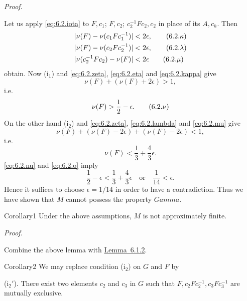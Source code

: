 \documentclass[b5paper,twoside]{article}
\newcommand{\lemref}[2]{\hyperref[#1]{\mbox{Lemma~#2}}}
\theoremstyle{mvnplain}
\renewenvironment{proof}[1][Proof]{%
  \par\addvspace{0.35\baselineskip}%
  \noindent\textit{#1.}\ \normalfont\ignorespaces
}{%
  \par\addvspace{0.35\baselineskip}%
}
\newcommand{\M}{\mathbf M}
\def\M{M}%
\def\Gamma{Gamma}%
\def\mathfrak#1{#1}%
\begin{document}
\begin{proof}
Let us apply \eqref{eq:6.2.iota} to
$\mathfrak F,c_1$; $\mathfrak F,c_2$;
$c_2^{-1}\mathfrak F c_2,c_2$ in place of its $\mathfrak A,c_h$. Then
\begin{align}
 |\nu(\mathfrak F)-\nu(c_1\mathfrak F c_1^{-1})|&<2\epsilon,
  \tag{6.2.\ensuremath{\kappa}}\label{eq:6.2.kappa}\\
 |\nu(\mathfrak F)-\nu(c_2\mathfrak F c_2^{-1})|&<2\epsilon,
  \tag{6.2.\ensuremath{\lambda}}\label{eq:6.2.lambda}\\
 |\nu(c_2^{-1}\mathfrak F c_2)-\nu(\mathfrak F)|&<2\epsilon
  \tag{6.2.\ensuremath{\mu}}\label{eq:6.2.mu}
\end{align}
obtain. Now (i$_1$) and \eqref{eq:6.2.zeta}, \eqref{eq:6.2.eta} and
\eqref{eq:6.2.kappa} give
\[
  \nu(\mathfrak F)+(\nu(\mathfrak F)+2\epsilon)>1,
\]
i.e.
\begin{equation}
  \nu(\mathfrak F)>\frac12-\epsilon.
  \tag{6.2.\ensuremath{\nu}}\label{eq:6.2.nu}
\end{equation}
On the other hand (i$_2$) and \eqref{eq:6.2.zeta},
\eqref{eq:6.2.lambda} and \eqref{eq:6.2.mu} give
\[
  \nu(\mathfrak F)+(\nu(\mathfrak F)-2\epsilon)
  +(\nu(\mathfrak F)-2\epsilon)<1,
\]
i.e.
\begin{equation}
  \nu(\mathfrak F)<\frac13+\frac43\epsilon.
  \tag{6.2.o}\label{eq:6.2.o}
\end{equation}
\eqref{eq:6.2.nu} and \eqref{eq:6.2.o} imply
\[
  \frac12-\epsilon<\frac13+\frac43\epsilon
  \quad\text{or}\quad \frac1{14}<\epsilon.
\]
Hence it suffices to choose $\epsilon=1/14$ in order to have a contradiction.
Thus we have shown that $\M$ cannot possess the property $\Gamma$.
\end{proof}

\begin{namedstatement}{Corollary}{1}\label{cor:6.2.1}
Under the above assumptions, $\M$ is not approximately finite.
\end{namedstatement}
\begin{proof}
Combine the above lemma with \lemref{lem:6.1.2}{6.1.2}.
\end{proof}

\begin{namedstatement}{Corollary}{2}\label{cor:6.2.2}
We may replace condition (i$_2$) on $\mathfrak G$ and $\mathfrak F$ by

\noindent(i$_2'$). There exist two elements $c_2$ and $c_3$ in $\mathfrak G$
such that $\mathfrak F,c_2\mathfrak F c_2^{-1},c_3\mathfrak F c_3^{-1}$ are
mutually exclusive.
\end{namedstatement}
\end{document}
